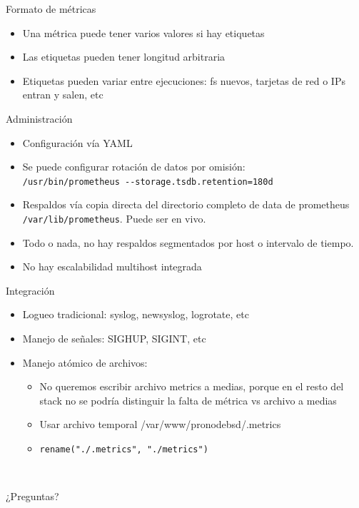\documentclass[11pt,spanish]{article}
\newcommand{\rowsp}[1][1em]{\vspace{#1}}
\newcommand{\hone}[1]{{\rowsp[0.3em]\noindent\Large #1 \rowsp[0.3em]}}
\newcommand{\displaypage}[1]{%
\
\vspace{\stretch{1}}
\begin{center}
\hone{#1}
\end{center}
\vspace{\stretch{1}}
}
\newcommand{\myitm}[1]{\begin{itemize}#1\end{itemize}}
\begin{document}
\newpage %
\hone{Formato de métricas}

\myitm{
\item Una métrica puede tener varios valores si hay etiquetas
\item Las etiquetas pueden tener longitud arbitraria
\item Etiquetas pueden variar entre ejecuciones: fs nuevos, tarjetas
	de red o IPs entran y salen, etc
}

\newpage %
\hone{Administración}

\myitm{
	\item Configuración vía YAML
	\item Se puede configurar rotación de datos por omisión: \\
		\lstinline{/usr/bin/prometheus --storage.tsdb.retention=180d}
	\item Respaldos vía copia directa del directorio completo de data de
		prometheus \lstinline{/var/lib/prometheus}. Puede ser en vivo.
	\item Todo o nada, no hay respaldos segmentados por host o intervalo de
		tiempo.
	\item No hay escalabilidad multihost integrada
}

\newpage %
\hone{Integración}

\myitm{
\item Logueo tradicional: syslog, newsyslog, logrotate, etc
\item Manejo de señales: SIGHUP, SIGINT, etc
\item Manejo atómico de archivos:
	\myitm{
	\item No queremos escribir archivo metrics a medias, porque
		en el resto del stack no se podría distinguir la falta
		de métrica vs archivo a medias
	\item Usar archivo temporal /var/www/pronodebsd/.metrics
	\item \lstinline|rename("./.metrics", "./metrics")|
	}
}

\newpage %
\displaypage{¿Preguntas?}

\label{lastpage}
\end{document}
